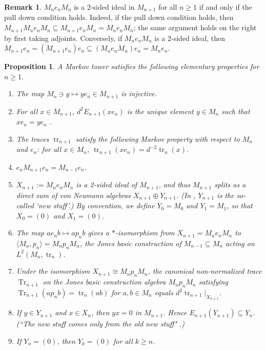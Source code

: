 \documentclass[11pt]{article}
\theoremstyle{plain}
\newtheorem{prop}[thm]{Proposition}
\theoremstyle{definition}
\newtheorem{rem}[thm]{Remark}
\DeclareMathOperator{\Tr}{Tr}
\DeclareMathOperator{\tr}{tr}
\begin{document}
\begin{rem}\label{pulldowniff}
$M_n e_n M_n$ is a 2-sided ideal in $M_{n+1}$ for all $n\geq 1$ if and only if the pull down condition holds. Indeed, if the pull down condition holds, then $M_{n+1} M_n e_n M_n \subseteq M_{n+1} e_n M_n = M_n e_n M_n$; the same argument holds on the right by first taking adjoints. Conversely, if $M_n e_n M_n$ is a 2-sided ideal, then $M_{n+1} e_n = (M_{n+1} e_n)e_n \subseteq (M_n e_n M_n) e_n = M_n e_n$.
\end{rem}

\begin{prop}\label{prop:ElementaryMarkov} A Markov tower satisfies the following elementary properties for $n\geq 1$.
\begin{enumerate}[label={\rm(EP\arabic*)}]
\item
\label{EP:Injective}
The map $M_{n}\ni y\mapsto ye_n \in M_{n+1}$ is injective.

\item
\label{EP:UniquePullDown}
For all $x\in M_{n+1}$, $d^{2}E_{n+1}(x e_n)$ is the unique element $y\in M_n$ such that $x e_n = ye_n$ \cite[Lem.~1.2]{MR860811}.

\item
\label{EP:MarkovTraces}
The traces $\tr_{n+1}$ satisfy the following \emph{Markov property} with respect to $M_n$ and $e_n$: for all $x\in M_n$, $\tr_{n+1}(xe_n) = d^{-2} \tr_n(x)$.

\item
\label{EP:CompressM_{n+1}}
$e_n M_{n+1}e_n = M_{n-1}e_n$.

\item
\label{EP:2SidedIdeal}
$X_{n+1}:=M_n e_n M_n$ is a 2-sided ideal of $M_{n+1}$, and thus $M_{n+1}$ splits as a direct sum of von Neumann algebras $X_{n+1}\oplus Y_{n+1}$.
(In \cite[Thm.~4.1.4 and Thm.~4.6.3]{MR999799}, $Y_{n+1}$ is the so-called `new stuff'.)
By convention, we define $Y_0 = M_0$ and $Y_1 = M_1$, so that $X_0 = (0)$ and $X_1 = (0)$.

\item
\label{EP:BasicContruction}
The map $ae_n b\mapsto ap_n b$ gives a $*$-isomorphism from $X_{n+1}=M_n e_n M_n$ to $\langle M_n , p_n\rangle=M_np_nM_n$, the Jones basic construction of $M_{n-1} \subseteq M_n$ acting on $L^2(M_n,\tr_n)$.

\item
\label{EP:OtherMarkovDef}
Under the isomorphism $X_{n+1} \cong M_n p_n M_n$, the canonical non-normalized trace $\Tr_{n+1}$ on the Jones basic construction algebra $M_np_nM_n$ satisfying $\Tr_{n+1}(ap_nb) = \tr_n(ab)$ for $a,b\in M_n$ equals $d^2 \tr_{n+1}|_{X_{n+1}}$.

\item
\label{EP:NewStuff}
If $y\in Y_{n+1}$ and $x\in X_{n}$, then $yx = 0$ in $M_{n+1}$.
Hence $E_{n+1}(Y_{n+1}) \subseteq Y_{n}$.
(``The new stuff comes only from the old new stuff" \cite{MR999799}.)

\item
\label{EP:FiniteDepth}
If $Y_n =(0)$, then $Y_{k} = (0)$ for all $k\geq n$.

\end{enumerate}
\end{prop}
\end{document}
